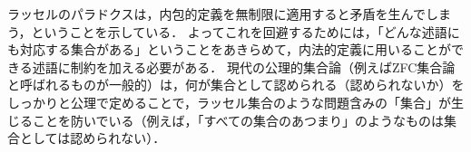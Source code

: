 \documentclass[11pt,a4paper]{jsarticle}
\begin{document}
ラッセルのパラドクスは，内包的定義を無制限に適用すると矛盾を生んでしまう，ということを示している．
よってこれを回避するためには，「どんな述語にも対応する集合がある」ということをあきらめて，内法的定義に用いることができる述語に制約を加える必要がある．
現代の公理的集合論（例えばZFC集合論と呼ばれるものが一般的）は，何が集合として認められる（認められないか）をしっかりと公理で定めることで，ラッセル集合のような問題含みの「集合」が生じることを防いでいる（例えば，「すべての集合のあつまり」のようなものは集合としては認められない）．





\end{document}
